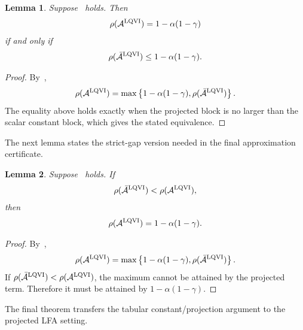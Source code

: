 \documentclass[letterpaper]{article}
\numberwithin{equation}{section}
\newtheorem{lemma}{Lemma}[section]
\begin{document}
\begin{lemma}
\label{lem:linear-fa-standard-jsr-equality}
Suppose~ holds. Then
\begin{align*}
  \rho(\mathcal A^{\rm LQVI})=1-\alpha(1-\gamma)
\end{align*}
if and only if
\begin{align*}
  \rho(\bar{\mathcal A}^{\rm LQVI})\le 1-\alpha(1-\gamma).
\end{align*}
\end{lemma}
\begin{proof}
By~,
\begin{align*}
  \rho(\mathcal A^{\rm LQVI})
  =\max\left\{1-\alpha(1-\gamma),\rho(\bar{\mathcal A}^{\rm LQVI})\right\}.
\end{align*}
The equality above holds exactly when the projected block is no larger than
the scalar constant block, which gives the stated equivalence.
\end{proof}

The next lemma states the strict-gap version needed in the final approximation
certificate.

\begin{lemma}
\label{lem:linear-fa-strict-gap-implies-standard-jsr}
Suppose~ holds. If
\begin{align*}
  \rho(\bar{\mathcal A}^{\rm LQVI})<\rho(\mathcal A^{\rm LQVI}),
\end{align*}
then
\begin{align*}
  \rho(\mathcal A^{\rm LQVI})=1-\alpha(1-\gamma).
\end{align*}
\end{lemma}
\begin{proof}
By~,
\begin{align*}
  \rho(\mathcal A^{\rm LQVI})
  =\max\left\{1-\alpha(1-\gamma),\rho(\bar{\mathcal A}^{\rm LQVI})\right\}.
\end{align*}
If $\rho(\bar{\mathcal A}^{\rm LQVI})<\rho(\mathcal A^{\rm LQVI})$, the maximum
cannot be attained by the projected term. Therefore it must be attained by
$1-\alpha(1-\gamma)$.
\end{proof}

The final theorem transfers the tabular constant/projection argument to the
projected LFA setting.
\end{document}
